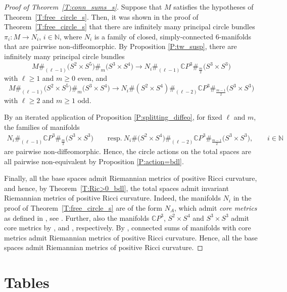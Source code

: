 \documentclass[10pt,a4paper]{amsart}
\numberwithin{equation}{section}
\theoremstyle{definition}
\numberwithin{table}{section}
\newcommand{\N}{\mathbb{N}}
\newcommand{\C}{\mathbb{C}}
\begin{document}
\begin{proof}[Proof of Theorem~\ref{T:conn_sums_s}]
	Suppose that $M$ satisfies the hypotheses of Theorem~\ref{T:free_circle_s}. Then, it was shown in the proof of Theorem~\ref{T:free_circle_s} that there are infinitely many principal circle bundles $\pi_i\colon M\to N_i$, $i\in\N$, where $N_i$ is a family of closed, simply-connected $6$-manifolds that are pairwise non-diffeomorphic. By Proposition \ref{P:tw_susp}, there are infinitely many principal circle bundles
	\[ M\#_{(\ell-1)}\bigl(S^2\times S^5\bigr)\#_m\bigl(S^3\times S^4\bigr)\to N_i\#_{(\ell-1)}\C P^3\#_{\frac{m}{2}}\bigl(S^3\times S^3\bigr) \]
	with $\ell\geq 1$ and $m\geq 0$ even, and{\samepage
	\[ M\#_{(\ell-1)}\bigl(S^2\times S^5\bigr)\#_m\bigl(S^3\times S^4\bigr)\to N_i\#(S^2\times S^4)\#_{(\ell-2)}\C P^3\#_{\frac{m-1}{2}}\bigl(S^3\times S^3\bigr) \]
	with $\ell\geq 2$ and $m\geq 1$ odd.}
	
	By an iterated application of Proposition \ref{P:splitting_diffeo}, for fixed $\ell$ and $m$, the families of manifolds
	\begin{gather*}
     N_i\#_{(\ell-1)}\C P^3\#_{\frac{m}{2}}\bigl(S^3\times S^3\bigr)\qquad \text{resp.}\  N_i\#\bigl(S^2\times S^4\bigr)\#_{(\ell-2)}\C P^3\#_{\frac{m-1}{2}}\bigl(S^3\times S^3\bigr),\qquad i\in\N
     \end{gather*}
	are pairwise non-diffeomorphic. Hence, the circle actions on the total spaces are all pairwise non-equivalent by Proposition \ref{P:action=bdl}.
	
	Finally, all the base spaces admit Riemannian metrics of positive Ricci curvature, and hence, by Theorem~\ref{T:Ric>0_bdl}, the total spaces admit invariant Riemannian metrics of positive Ricci curvature. Indeed, the manifolds $N_i$ in the proof of Theorem~\ref{T:free_circle_s} are of the form $N_A$, which admit \emph{core metrics} as defined in \cite{Bu19}, see \cite[Theorem B]{Re23}. Further, also the manifolds $\C P^3$, $S^2\times S^4$ and $S^3\times S^3$ admit core metrics by \cite[Theorem C]{Bu19}, \cite[Theorem C]{Re23} and \cite[Theorem B]{Bu20}, respectively. By \cite[Theorem B]{Bu19}, connected sums of manifolds with core metrics admit Riemannian metrics of positive Ricci curvature. Hence, all the base spaces admit Riemannian metrics of positive Ricci curvature.
\end{proof}

\appendix

\section{Tables}\label{S:Tables}
\end{document}
